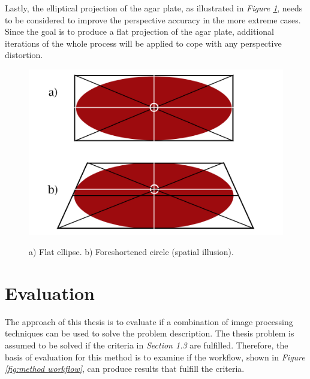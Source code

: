 \noindent Lastly, the elliptical projection of the agar plate, as illustrated in \textit{Figure \ref{fig:method projection}}, needs to be considered to improve the perspective accuracy in the more extreme cases. Since the goal is to produce a flat projection of the agar plate, additional iterations of the whole process will be applied to cope with any perspective distortion.

\begin{figure}[H]
    \centering
    \includegraphics[width=0.5\linewidth]{figures/PDF/Ellipse_projection.pdf}\\
    \caption{a) Flat ellipse. b) Foreshortened circle (spatial illusion).}
    \label{fig:method projection}
\end{figure}



\section{Evaluation}
The approach of this thesis is to evaluate if a combination of image processing techniques can be used to solve the problem description. The thesis problem is assumed to be solved if the criteria in \textit{Section 1.3} are fulfilled. Therefore, the basis of evaluation for this method is to examine if the workflow, shown in \textit{Figure \ref{fig:method workflow}}, can produce results that fulfill the criteria. 



